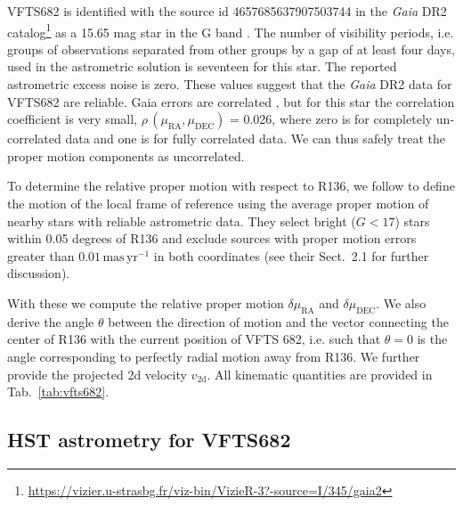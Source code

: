 \documentclass[apjl,twocolumn]{emulateapj}
\newcommand{\masyr}{\,\mathrm{mas}\,\mathrm{yr}^{-1}}
\begin{document}
VFTS682 is identified with the source id 4657685637907503744 in the
\emph{Gaia} DR2 catalog\footnote{\url{https://vizier.u-strasbg.fr/viz-bin/VizieR-3?-source=I/345/gaia2}}
  as a 15.65 mag star in the G band
\citep{gaia:16,brown:18}.   The number of visibility periods,
i.e. groups of observations separated from other groups by a gap of at
least four days, used in the astrometric solution is seventeen for this
star. The reported astrometric excess noise is zero.  These values
suggest that the \emph{Gaia} DR2  data for VFTS682 are
reliable. Gaia errors are correlated \citep[][]{lindengren:18}, but for this star the correlation coefficient is very small, $\rho\,(\mu_\mathrm{RA}, \mu_\mathrm{DEC})$  = 0.026, where zero is for completely un-correlated data and one is for fully correlated data. We can thus safely treat the proper motion components as uncorrelated.

To determine the relative proper motion with respect to R136, we follow  \citet{lennon:18} to define the motion of the local frame of reference using the average proper motion of nearby stars with reliable astrometric data.  They select  bright ($G<17$) stars within 0.05 degrees of R136 and exclude sources with proper motion errors greater than $0.01\masyr$ in both coordinates (see their  Sect.~2.1 for further discussion).  

With these we compute the relative proper motion
$\delta\mu_\mathrm{RA}$ and $\delta\mu_\mathrm{DEC}$.  We also derive
the angle $\theta$ between the direction of motion and the vector
connecting the center of R136 with the current position of VFTS 682,
i.e. such that $\theta = 0$ is the angle corresponding to perfectly
radial motion away from R136.    We further provide %
the %
projected 2d velocity
$v_\mathrm{2d}$.   All kinematic quantities are provided in
Tab.~\ref{tab:vfts682}. %



\subsection{HST astrometry for VFTS682}
\end{document}
